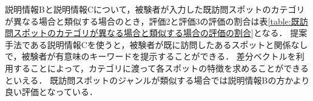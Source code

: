 \documentclass{deimj}
\begin{document}
説明情報Bと説明情報Cについて，被験者が入力した既訪問スポットのカテゴリが異なる場合と類似する場合のとき，評価2と評価3の評価の割合は表\ref{table:既訪問スポットのカテゴリが異なる場合と類似する場合の評価の割合}となる．
提案手法である説明情報Cを使うと，被験者が既に訪問したあるスポットと関係なしで，被験者が有意味のキーワードを提示することができる．
差分ベクトルを利用することによって，カテゴリに渡って各スポットの特徴を求めることができるといえる．
既訪問スポットのジャンルが類似する場合では説明情報Bの方かより良い評価となっている．

%
%
%
\end{document}
